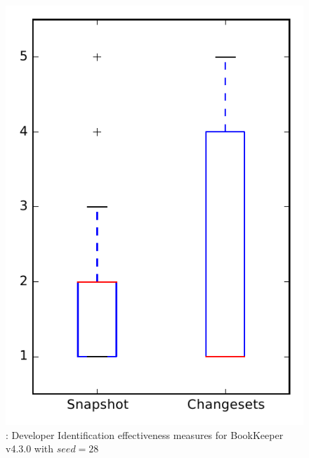 
\begin{figure}
\centering
\includegraphics[height=0.4\textheight]{figures/dit_seed/rq1_bookkeeper_28}
\caption{\rtwo: Developer Identification effectiveness measures for BookKeeper v4.3.0 with $seed=28$}
\label{fig:dit_seed:rq1:bookkeeper}
\end{figure}
